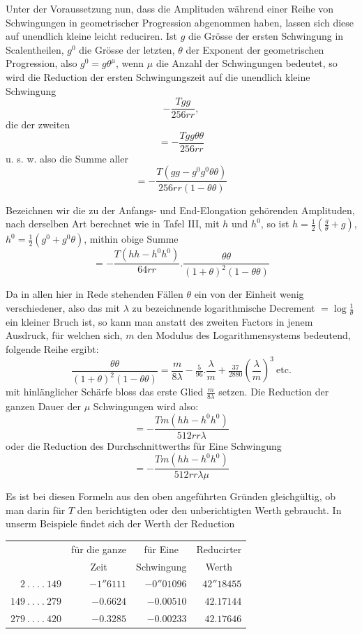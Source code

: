 Unter der Voraussetzung nun, dass die Amplituden während einer Reihe von Schwingungen in geometrischer Progression abgenommen haben, lassen sich diese auf unendlich kleine leicht reduciren. Ist $g$ die Grösse der ersten Schwingung in Scalentheilen, $g^0$ die Grösse der letzten, $\theta$ der Exponent der geometrischen Progression, also $g^0=g\theta^\mu$, wenn $\mu$ die Anzahl der Schwingungen bedeutet, so wird die Reduction der ersten Schwingungszeit auf die unendlich kleine Schwingung
\[
-\frac{Tgg}{256rr},
\]
die der zweiten
\[
=-\frac{Tgg\theta\theta}{256rr}
\]
u. s. w. also die Summe aller
\[
=-\frac{T(gg-g^0g^0\theta\theta)}{256rr(1-\theta\theta)}
\]

\par\clearpage
{}
Bezeichnen wir die zu der Anfangs- und End-Elongation gehörenden Amplituden, nach derselben Art berechnet wie in Tafel III, mit $h$ und $h^0$, so ist $h=\tfrac12(\frac{g}{\theta}+g)$, $h^0=\tfrac12(g^0+g^0\theta)$, mithin obige Summe
\[
=-\frac{T(hh-h^0h^0)}{64rr}.\frac{\theta\theta}{(1+\theta)^2(1-\theta\theta)}
\]

Da in allen hier in Rede stehenden Fällen $\theta$ ein von der Einheit wenig verschiedener, also das mit $\lambda$ zu bezeichnende logarithmische Decrement $=\log\frac1\theta$ ein kleiner Bruch ist, so kann man anstatt des zweiten Factors in jenem Ausdruck, für welchen sich, $m$ den Modulus des Logarithmensystems bedeutend, folgende Reihe ergibt:
\[
\frac{\theta\theta}{(1+\theta)^2(1-\theta\theta)}=\frac{m}{8\lambda}-\tfrac5{96}.\frac{\lambda}{m}+\tfrac{37}{2880}(\frac{\lambda}{m})^3\ \text{etc.}
\]
mit hinlänglicher Schärfe bloss das erste Glied $\frac{m}{8\lambda}$ setzen. Die Reduction der ganzen Dauer der $\mu$ Schwingungen wird also:
\[
=-\frac{Tm(hh-h^0h^0)}{512rr\lambda}
\]
oder die Reduction des Durchschnittwerths für Eine Schwingung
\[
=-\frac{Tm(hh-h^0h^0)}{512rr\lambda\mu}
\]

Es ist bei diesen Formeln aus den oben angeführten Gründen gleichgültig, ob man darin für $T$ den berichtigten oder den unberichtigten Werth gebraucht. In unserm Beispiele findet sich der Werth der Reduction
\begin{center}
\fontsize{9}{11}\selectfont
\begin{tabular}{r|r|r|r}
& \multicolumn{1}{c|}{für die ganze} & \multicolumn{1}{c|}{für Eine} & \multicolumn{1}{c}{Reducirter}\\
& \multicolumn{1}{c|}{Zeit} & \multicolumn{1}{c|}{Schwingung} & \multicolumn{1}{c}{Werth}\\[5pt]
$2\ .\ .\ .\ .\ 149$ & $-1''6111$ & $-0''01096$ & $42''18455$\\
$149\ .\ .\ .\ .\ 279$ & $-0.6624$ & $-0.00510$ & $42.17144$\\
$279\ .\ .\ .\ .\ 420$ & $-0.3285$ & $-0.00233$ & $42.17646$
\end{tabular}
\end{center}

